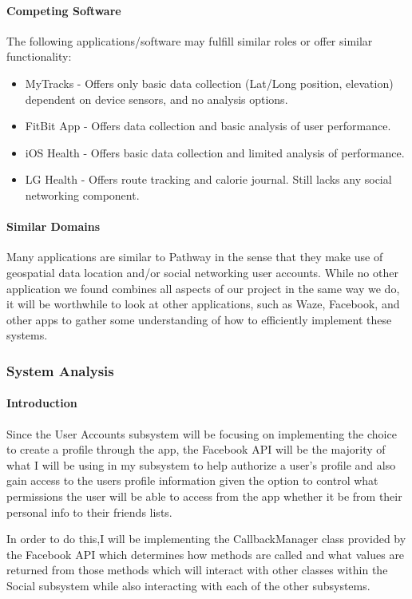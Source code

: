 \documentclass{article}
\begin{document}
\paragraph{Competing Software}
The following applications/software may fulfill similar roles or offer similar functionality:
\begin{itemize}
    \item MyTracks - Offers only basic data collection (Lat/Long position, elevation) dependent on device sensors, and no analysis options.
    \item FitBit App - Offers data collection and basic analysis of user performance.
    \item iOS Health - Offers basic data collection and limited analysis of performance.
    \item LG Health - Offers route tracking and calorie journal. Still lacks any social networking component.
\end{itemize}

\paragraph{Similar Domains}
Many applications are similar to Pathway in the sense that they make use of geospatial data location and/or social networking user accounts. While no other application we found combines all aspects of our project in the same way we do, it will be worthwhile to look at other applications, such as Waze, Facebook, and other apps to gather some understanding of how to efficiently implement these systems.

\subsubsection{System Analysis}
\paragraph{Introduction}
Since the User Accounts subsystem will be focusing on implementing the choice to create a profile through the app, the Facebook API will be the majority of what I will be using in my subsystem to help authorize a user’s profile and also gain access to the users profile information given the option to control what permissions the user will be able to access from the app whether it be from their personal info to their friends lists.
	
In order to do this,I will be implementing the CallbackManager class provided by the Facebook API which determines how methods are called and what values are returned from those methods which will interact with other classes within the Social subsystem while also interacting with each of the other subsystems.
\end{document}
